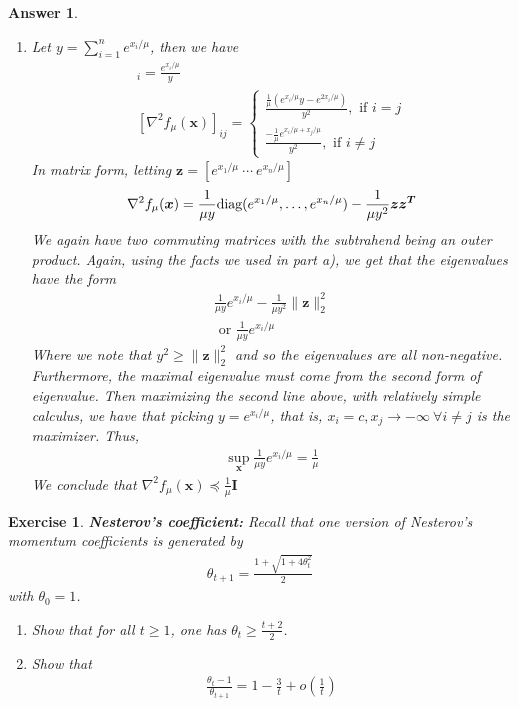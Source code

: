 \documentclass[12pt]{article}
\theoremstyle{colon}
\newtheorem{exercise}{Exercise}
\newtheorem*{answer}{Answer}
\begin{document}
\begin{answer}
\begin{enumerate}[label=\alph*)]
		\item Let $y = \sum_{i=1}^n e^{x_i/\mu}$, then we have
			\begin{gather*}
				[ \nabla f_\mu (\bm{x}) ]_i = \frac{e^{x_i/\mu}}{y} \\
				[ \nabla^2 f_\mu (\bm{x}) ]_{ij} = \begin{cases}
					\frac{\frac{1}{\mu} (e^{x_i/\mu}y - e^{2x_i/\mu})}{y^2}, \text{ if } i = j \\
					\frac{-\frac{1}{\mu} e^{x_i/\mu + x_j/\mu}}{y^2}, \text{ if } i \neq j
				\end{cases}
			\end{gather*}
			In matrix form, letting $\bm{z} = [e^{x_1/\mu} \ \cdots \ e^{x_n/\mu}]$
			\begin{gather*}
				\nabla^2 f_\mu (\bm{x}) = \frac{1}{\mu y} \text{diag}(e^{x_1/\mu}, \mathellipsis, e^{x_n/\mu}) - \frac{1}{\mu y^2} \bm{z} \bm{z^T}
			\end{gather*}
			We again have two commuting matrices with the subtrahend being an outer product. Again, using the facts we used in part a), we get that the eigenvalues have the form
			\begin{gather*}
				\frac{1}{\mu y} e^{x_i/\mu} - \frac{1}{\mu y^2} \lVert \bm{z} \rVert_2^2 \\
				\text{ or } \frac{1}{\mu y} e^{x_i/\mu}
			\end{gather*}
			Where we note that $y^2 \geq \lVert \bm{z} \rVert_2^2$ and so the eigenvalues are all non-negative. Furthermore, the maximal eigenvalue must come from the second form of eigenvalue. Then maximizing the second line above, with relatively simple calculus, we have that picking $y = e^{x_i/\mu}$, that is, $x_i = c, x_j \rightarrow -\infty \ \forall i \neq j$ is the maximizer. Thus,
			\begin{gather*}
				\sup_{\bm{x}} \frac{1}{\mu y} e^{x_i/\mu} = \frac{1}{\mu}
			\end{gather*}
			We conclude that $\nabla^2 f_\mu(\bm{x}) \preceq \frac{1}{\mu} \bm{I}$
	\end{enumerate}
\end{answer}

\clearpage

\begin{exercise}
	\textbf{Nesterov's coefficient:} Recall that one version of Nesterov's momentum coefficients is generated by
	\begin{gather*}
		\theta_{t+1} = \frac{1 + \sqrt{1 + 4 \theta_t^2}}{2}
	\end{gather*}
	with $\theta_0 = 1$.
	\begin{enumerate}[label=\alph*)]
		\item Show that for all $t \geq 1$, one has $\theta_t \geq \frac{t+2}{2}$.
		\item Show that
			\begin{gather*}
				\frac{\theta_t - 1}{\theta_{t+1}} = 1 - \frac{3}{t} + o(\frac{1}{t})
			\end{gather*}
	\end{enumerate}
\end{exercise}
\end{document}

